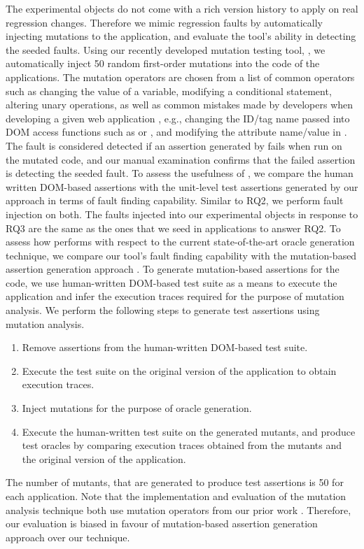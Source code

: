 The experimental objects do not come with a rich version history to apply \tool on real regression changes. Therefore we mimic regression faults by automatically injecting mutations to the application, and evaluate the tool's ability in detecting the seeded faults. Using our recently developed mutation testing tool, \mutandis \cite{mirshokraie:icst13}, we automatically inject 50 random first-order mutations into the \javascript code of the applications. The mutation operators are chosen from a list of common operators such as changing the value of a variable, modifying a conditional statement, altering unary operations, as well as common mistakes made by developers when developing a given web application \cite{mirshokraie:tse15}, e.g., changing the ID/tag name passed into DOM access functions such as  or , and modifying the attribute name/value in . The fault is considered detected if an assertion generated by \tool fails when run on the mutated code, and our manual examination confirms that the failed assertion is detecting the seeded fault.
 To assess the usefulness of \tool, we compare the human written DOM-based assertions with the unit-level test assertions generated by our approach in terms of fault finding capability.
Similar to RQ2, we perform fault injection on both.
The faults injected into our experimental objects in response to RQ3 are the same as the ones that we seed in applications to answer RQ2.
 To assess how \tool performs with respect to the current state-of-the-art oracle generation technique, we compare our tool's fault finding capability with the mutation-based assertion generation approach \cite{mirshokraie:icst15, fraser:tse12}. To generate mutation-based assertions for the \javascript code, we use human-written DOM-based test suite as a means to execute the application and infer the execution traces required for the purpose of mutation analysis. We perform the following steps to generate test assertions using mutation analysis.
\begin{enumerate}
\item Remove assertions from the human-written DOM-based test suite.
\item Execute the test suite on the original version of the application to obtain execution traces.
\item Inject mutations for the purpose of oracle generation.
\item Execute the human-written test suite on the generated mutants, and produce test oracles by comparing execution traces obtained from the mutants and the original version of the application.
\end{enumerate}
The number of mutants, that are generated to produce test assertions is 50 for each application. Note that the implementation and evaluation of the mutation analysis technique both use mutation operators from our prior work \cite{mirshokraie:tse15}. Therefore, our evaluation is biased in favour of mutation-based assertion generation approach over our technique.


 

